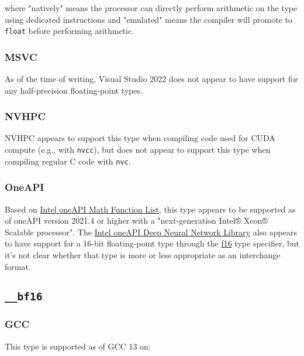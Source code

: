 \documentclass[../HDF5_RFC.tex]{subfiles}
\begin{document}
where "natively" means the processor can directly perform arithmetic on the type using
dedicated instructions and "emulated" means the compiler will promote to \texttt{float}
before performing arithmetic.

\subsubsection{MSVC}

As of the time of writing, Visual Studio 2022 does not appear to have support for any half-precision floating-point types.

\subsubsection{NVHPC}

NVHPC appears to support this type when compiling code used for CUDA compute (e.g., with \texttt{nvcc}), but
does not appear to support this type when compiling regular C code with \texttt{nvc}.

\subsubsection{OneAPI}

Based on \href{https://www.intel.com/content/www/us/en/docs/dpcpp-cpp-compiler/developer-guide-reference/2024-0/math-function-list.html}{Intel oneAPI Math Function List}, this type appears to be supported as of oneAPI version 2021.4 or higher with a "next-generation Intel® Xeon® Scalable processor".
The \href{https://www.intel.com/content/www/us/en/developer/tools/oneapi/onednn.html#gs.3ikawv}{Intel oneAPI Deep Neural Network Library} also appears
to have support for a 16-bit floating-point type through the \href{https://www.intel.com/content/www/us/en/docs/onednn/developer-guide-reference/2024-0/data-types-001.html}{f16} type specifier, but it's not clear whether that type is more or less appropriate as an interchange format.

\subsection{\texttt{\_\_bf16}}

\subsubsection{GCC}

This type is supported as of GCC 13 on:
\end{document}
